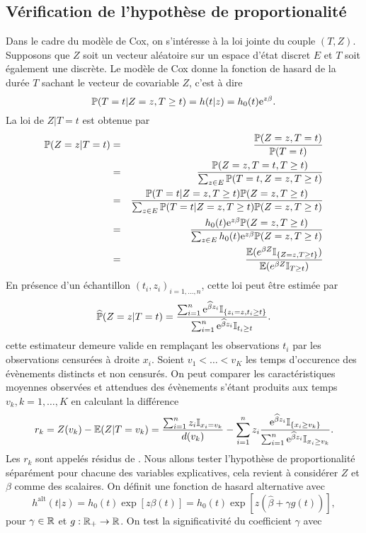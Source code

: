\subsection{Vérification de l'hypothèse de proportionalité}
Dans le cadre du modèle de Cox, on s'intéresse à la loi jointe du couple $(T,Z)$. Supposons que $Z$ soit un vecteur aléatoire sur un espace d'état discret $E$ et $T$ soit également une \va discrète. Le modèle de Cox donne la fonction de hasard de la durée $T$ sachant le vecteur de covariable $Z$, c'est à dire 
$$
\mathbb{P}(T = t|Z =z,T\geq t) = h(t|z) = h_0(t)\mathrm{e}^{z\beta}.
$$
La loi de $Z|T=t$ est obtenue par 
\begin{eqnarray*}
\mathbb{P}(Z=z|T=t) &=& \frac{\mathbb{P}(Z=z,T=t)}{\mathbb{P}(T=t)}\\
&=&\frac{\mathbb{P}(Z=z,T=t, T\geq t)}{\sum_{z\in E}\mathbb{P}(T=t, Z=z, T\geq t)} \\
&=& \frac{\mathbb{P}(T=t|Z=z,T\geq t)\mathbb{P}(Z=z,T\geq t)}{\sum_{z\in E}\mathbb{P}(T=t| Z=z, T\geq t)\mathbb{P}(Z=z, T\geq t)}\\
&=& \frac{h_0(t)\mathrm{e}^{z\beta}\mathbb{P}(Z=z,T\geq t)}{\sum_{z\in E}h_0(t)\mathrm{e}^{z\beta}\mathbb{P}(Z=z, T\geq t)}\\
&=&\frac{\mathbb{E}(e^{\beta Z}\mathbb{I}_{\{Z = z, T\geq t\}})}{\mathbb{E}(e^{\beta Z}\mathbb{I}_{T\geq t})}
\end{eqnarray*}
En présence d'un échantillon \iid $(t_i, z_i)_{i = 1,\ldots, n}$, cette loi peut être estimée par 
$$
\widehat{\mathbb{P}}(Z=z|T=t) = \frac{\sum_{i = 1}^n\mathrm{e}^{\widehat{\beta} z_i}\mathbb{I}_{\{ z_i = z, t_i\geq t\}}}{\sum_{i = 1}^n \mathrm{e}^{\widehat{\beta} z_i}\mathbb{I}_{t_i\geq t}}.
$$
cette estimateur demeure valide en remplaçant les observations $t_i$ par les observations censurées à droite $x_i$. Soient $v_1<\ldots < v_K$ les temps d'occurence des évènements distincts et non censurés. On peut comparer les caractéristiques moyennes observées et attendues des évènements s'étant produits aux temps $v_k,k=1,\ldots, K$ en calculant la différence
$$
r_k = Z(v_k) - \mathbb{E}(Z|T = v_k) = \frac{\sum_{i=1}^nz_i\mathbb{I}_{x_i = v_k}}{d(v_k)}  - \sum_{i = 1}^nz_i\frac{\mathrm{e}^{\widehat{\beta} z_i}\mathbb{I}_{\{ x_i\geq v_k\}}}{\sum_{i = 1}^n \mathrm{e}^{\widehat{\beta} z_i}\mathbb{I}_{x_i\geq v_k}}.
$$
Les $r_k$ sont appelés résidus de \citet{SCHOENFELD1982}. Nous allons tester l'hypothèse de proportionalité séparément pour chacune des variables explicatives, cela revient à considérer $Z$ et $\beta$ comme des scalaires. On définit une fonction de hasard alternative avec 
$$
h^{\text{alt}}(t|z) = h_0(t)\exp[z\beta(t)] = h_0(t)\exp[z(\widehat{\beta}+\gamma g(t))],
$$
pour $\gamma\in \mathbb{R}$ et $g:\mathbb{R}_+\rightarrow\mathbb{R}$. On test la significativité du coefficient $\gamma$ avec 
